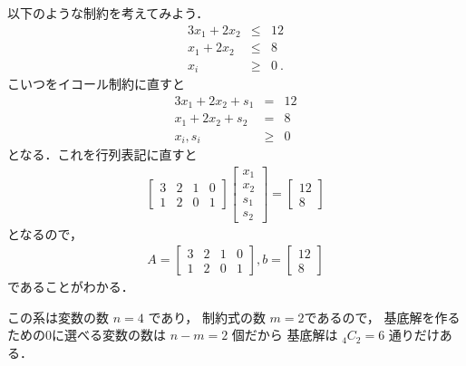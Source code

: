 \documentclass[11pt, a4]{article}
\begin{document}
以下のような制約を考えてみよう．
\begin{eqnarray}
  3x_1 + 2x_2 &\leq& 12\nonumber\\
  x_1 + 2x_2 &\leq& 8\nonumber\\
  x_i&\geq&0\ .
  \label{example}
\end{eqnarray}
こいつをイコール制約に直すと
\begin{eqnarray}
  3x_1 + 2x_2 + s_1 &=& 12\nonumber\\
  x_1 + 2x_2 + s_2&=& 8\nonumber\\
  x_i, s_i&\geq&0
\end{eqnarray}
となる．これを行列表記に直すと
\begin{eqnarray}
  \left[
  \begin{array}{cccc}
    3&2&1&0\\
    1&2&0&1
  \end{array}
  \right]
  \left[
  \begin{array}{c}
    x_1\\
    x_2\\
    s_1\\
    s_2
  \end{array}
  \right]
  =
  \left[
  \begin{array}{c}
    12\\
    8
  \end{array}
  \right]
\end{eqnarray}
となるので，
\begin{eqnarray}
  A =
  \left[
  \begin{array}{cccc}
    3&2&1&0\\
    1&2&0&1
  \end{array}
  \right]
  ,
  b =
  \left[
  \begin{array}{c}
    12\\
    8
  \end{array}
  \right]
\end{eqnarray}
であることがわかる．

この系は変数の数 $n = 4$ であり，
制約式の数 $m = 2$であるので，
基底解を作るための$0$に選べる変数の数は $n - m = 2$ 個だから
基底解は ${}_{4}C_2 = 6$ 通りだけある．
\end{document}
